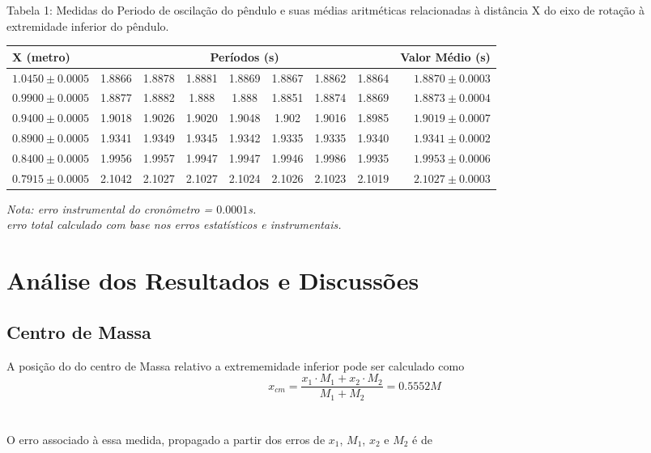 \documentclass[12pt,a4paper]{article}
\begin{document}
\begin{table}[!htbp]

{Tabela 1: Medidas do Periodo de oscilação do pêndulo e suas médias aritméticas relacionadas à distância X do eixo de rotação à extremidade inferior do pêndulo.}\\[10pt] 	%

\def\arraystretch{1.5}
\begin{tabular}{|l| c c c c c c c|r|}
\hline 
X (metro) & \multicolumn{7}{c|}{Períodos (s)} & {Valor Médio (s)} \\ 
\hline
$1.0450\pm0.0005$ & 1.8866 & 1.8878 & 1.8881 & 1.8869 & 1.8867 & 1.8862 & 1.8864 & $1.8870 \pm 0.0003 $ \\
\hline
$0.9900\pm0.0005$ & 1.8877 & 1.8882 & 1.888 & 1.888 & 1.8851 & 1.8874 & 1.8869 & $1.8873 \pm 0.0004 $\\
\hline
$0.9400\pm0.0005$ & 1.9018 & 1.9026 & 1.9020 & 1.9048 & 1.902 & 1.9016 & 1.8985 & $1.9019 \pm 0.0007$\\
\hline
$0.8900\pm0.0005$ & 1.9341 & 1.9349 & 1.9345 & 1.9342 & 1.9335 & 1.9335 & 1.9340 & $1.9341 \pm 0.0002$\\
\hline
$0.8400\pm0.0005$ & 1.9956 & 1.9957 & 1.9947 & 1.9947 & 1.9946 & 1.9986 & 1.9935 & $1.9953 \pm 0.0006$\\
\hline
$0.7915\pm0.0005$ & 2.1042 & 2.1027 & 2.1027 & 2.1024 & 2.1026 & 2.1023 & 2.1019 & $2.1027 \pm 0.0003 $\\
\hline
\end{tabular}

\emph{Nota: erro instrumental do cronômetro = $0.0001$s.\\ erro total calculado com base nos erros estatísticos e instrumentais.}
\end{table}


\newpage

\section{Análise dos Resultados e Discussões}
\subsection{Centro de Massa}
A posição do do centro de Massa relativo a extrememidade inferior pode ser calculado como\\
$$ x_{cm} = \frac{x_1 \cdot M_1 + x_2 \cdot M_2}{M_1 + M_2} = 0.5552 M $$\\ \\
O erro associado à essa medida, propagado a partir dos erros de $x_1$, $M_1$, $x_2$ e $M_2$ é de 
\end{document}
